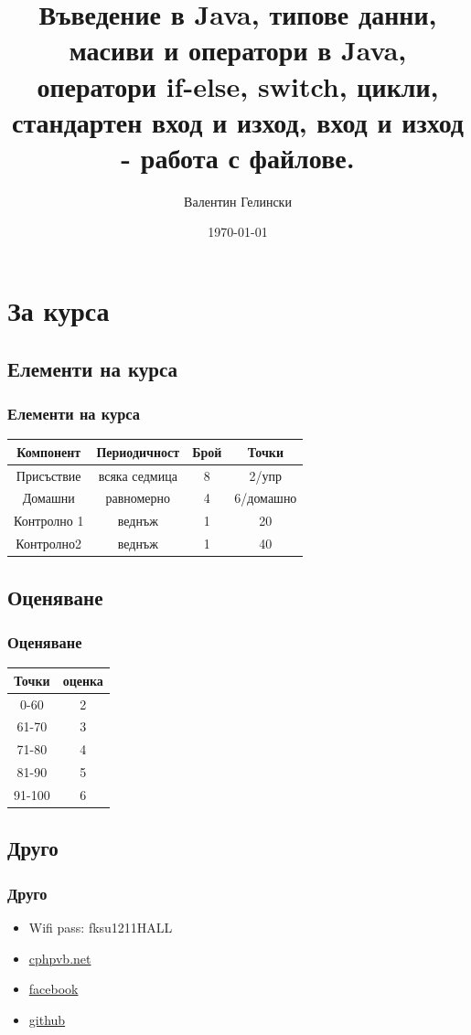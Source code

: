 \documentclass{beamer}
\title{Въведение в Java, типове данни, масиви и оператори в Java, оператори if-else, switch, цикли, стандартен вход и изход, вход и изход - работа с файлове.}
\author{Валентин Гелински}
\institute{ТУ София}
\date{\today}
\begin{document}
  \begin{frame} 
    \titlepage
  \end{frame}

  \section{За курса} 
  \subsection{Елементи на курса}

  \begin{frame} 
    \frametitle{Елементи на курса}
     \begin{tabular}{|c|c|c|c|}
       \hline
       Компонент&Периодичност&Брой&Точки\\
       \hline
       Присъствие&всяка седмица&8&2/упр\\
       \hline
       Домашни&равномерно&4&6/домашно\\
       \hline
       Контролно 1&веднъж&1&20\\
       \hline
       Контролно2&веднъж&1&40\\
       \hline
     \end{tabular}
  \end{frame}

  \subsection{Оценяване}

  \begin{frame}
    \frametitle{Оценяване}
    \begin{tabular}{|c|c|}
      \hline
      Точки&оценка\\
      \hline
      0-60&2\\
      \hline
      61-70&3\\
      \hline
      71-80&4\\
      \hline
      81-90&5\\
      \hline
      91-100&6\\
      \hline
    \end{tabular}
  \end{frame}

  \subsection{Друго}

  \begin{frame}
    \frametitle{Друго}
    \begin{itemize}
      \item{Wifi pass: fksu1211HALL}
      \item{\href{http://cphpvb.net/category/java/}{cphpvb.net}}
      \item{\href{https://www.facebook.com/groups/617381621641455/}{facebook}}
      \item{\href{https://github.com/vgelinski/tu_java_course}{github}}
    \end{itemize}
  \end{frame}
\end{document}
